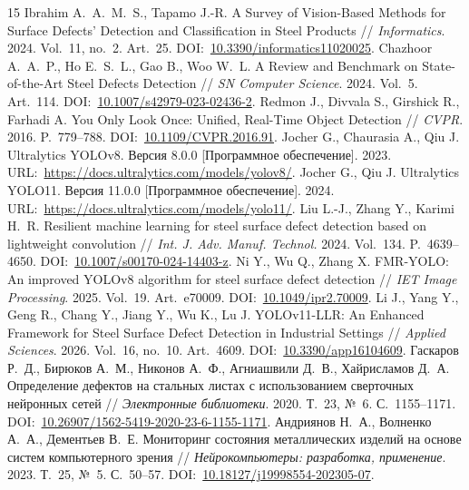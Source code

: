 \documentclass{misisarticle}
\begin{document}
\begin{thebibliography}{15}
 Ibrahim A.~A.~M.~S., Tapamo J.-R. A Survey of Vision-Based Methods for Surface Defects' Detection and Classification in Steel Products // \textit{Informatics}. 2024. Vol.~11, no.~2. Art.~25. DOI:~\href{https://doi.org/10.3390/informatics11020025}{10.3390/informatics11020025}.
 Chazhoor A.~A.~P., Ho E.~S.~L., Gao B., Woo W.~L. A Review and Benchmark on State-of-the-Art Steel Defects Detection // \textit{SN Computer Science}. 2024. Vol.~5. Art.~114. DOI:~\href{https://doi.org/10.1007/s42979-023-02436-2}{10.1007/s42979-023-02436-2}.
 Redmon J., Divvala S., Girshick R., Farhadi A. You Only Look Once: Unified, Real-Time Object Detection // \textit{CVPR}. 2016. P.~779--788. DOI:~\href{https://doi.org/10.1109/CVPR.2016.91}{10.1109/CVPR.2016.91}.
 Jocher G., Chaurasia A., Qiu J. Ultralytics YOLOv8. Версия 8.0.0 [Программное обеспечение]. 2023. URL:~\url{https://docs.ultralytics.com/models/yolov8/}.
 Jocher G., Qiu J. Ultralytics YOLO11. Версия 11.0.0 [Программное обеспечение]. 2024. URL:~\url{https://docs.ultralytics.com/models/yolo11/}.
 Liu L.-J., Zhang Y., Karimi H.~R. Resilient machine learning for steel surface defect detection based on lightweight convolution // \textit{Int. J. Adv. Manuf. Technol.} 2024. Vol.~134. P.~4639--4650. DOI:~\href{https://doi.org/10.1007/s00170-024-14403-z}{10.1007/s00170-024-14403-z}.
 Ni Y., Wu Q., Zhang X. FMR-YOLO: An improved YOLOv8 algorithm for steel surface defect detection // \textit{IET Image Processing}. 2025. Vol.~19. Art.~e70009. DOI:~\href{https://doi.org/10.1049/ipr2.70009}{10.1049/ipr2.70009}.
 Li J., Yang Y., Geng R., Chang Y., Jiang Y., Wu K., Lu J. YOLOv11-LLR: An Enhanced Framework for Steel Surface Defect Detection in Industrial Settings // \textit{Applied Sciences}. 2026. Vol.~16, no.~10. Art.~4609. DOI:~\href{https://doi.org/10.3390/app16104609}{10.3390/app16104609}.
 Гаскаров Р.~Д., Бирюков А.~М., Никонов А.~Ф., Агниашвили Д.~В., Хайрисламов Д.~А. Определение дефектов на стальных листах с использованием сверточных нейронных сетей // \textit{Электронные библиотеки}. 2020. Т.~23, №~6. С.~1155--1171. DOI:~\href{https://doi.org/10.26907/1562-5419-2020-23-6-1155-1171}{10.26907/1562-5419-2020-23-6-1155-1171}.
 Андриянов Н.~А., Волненко А.~А., Дементьев В.~Е. Мониторинг состояния металлических изделий на основе систем компьютерного зрения // \textit{Нейрокомпьютеры: разработка, применение}. 2023. Т.~25, №~5. С.~50--57. DOI:~\href{https://doi.org/10.18127/j19998554-202305-07}{10.18127/j19998554-202305-07}.

\end{thebibliography}
\end{document}
